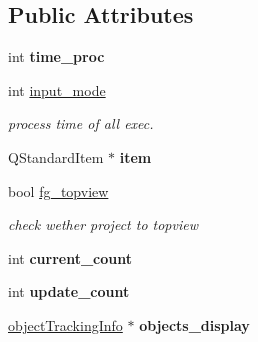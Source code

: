 \subsection*{Public Attributes}
\begin{DoxyCompactItemize}
\item 
\hypertarget{class_radar_controller_ab393942663adff0c31ede28c791d96e0}{}int {\bfseries time\+\_\+proc}\label{class_radar_controller_ab393942663adff0c31ede28c791d96e0}

\item 
\hypertarget{class_radar_controller_a9a911db3343eef6f1d90a4cac9118da3}{}int \hyperlink{class_radar_controller_a9a911db3343eef6f1d90a4cac9118da3}{input\+\_\+mode}\label{class_radar_controller_a9a911db3343eef6f1d90a4cac9118da3}

\begin{DoxyCompactList}\small\item\em process time of all exec. \end{DoxyCompactList}\item 
\hypertarget{class_radar_controller_a7f7b2abe18e175eaf55e3c6defcd0d22}{}Q\+Standard\+Item $\ast$ {\bfseries item}\label{class_radar_controller_a7f7b2abe18e175eaf55e3c6defcd0d22}

\item 
\hypertarget{class_radar_controller_a4ad550185a11d28e858e35aaef0b3c5b}{}bool \hyperlink{class_radar_controller_a4ad550185a11d28e858e35aaef0b3c5b}{fg\+\_\+topview}\label{class_radar_controller_a4ad550185a11d28e858e35aaef0b3c5b}

\begin{DoxyCompactList}\small\item\em check wether project to topview \end{DoxyCompactList}\item 
\hypertarget{class_radar_controller_a7fea3e37741df4cd44872e2d79e12e9f}{}int {\bfseries current\+\_\+count}\label{class_radar_controller_a7fea3e37741df4cd44872e2d79e12e9f}

\item 
\hypertarget{class_radar_controller_a8661918ec38107b526997b5f9e41faf3}{}int {\bfseries update\+\_\+count}\label{class_radar_controller_a8661918ec38107b526997b5f9e41faf3}

\item 
\hypertarget{class_radar_controller_a995fcdaa4d1637ab4bdf5044cbc135f1}{}\hyperlink{struct_radar_controller_1_1object_tracking_info}{object\+Tracking\+Info} $\ast$ {\bfseries objects\+\_\+display}\label{class_radar_controller_a995fcdaa4d1637ab4bdf5044cbc135f1}


\end{DoxyCompactItemize}
